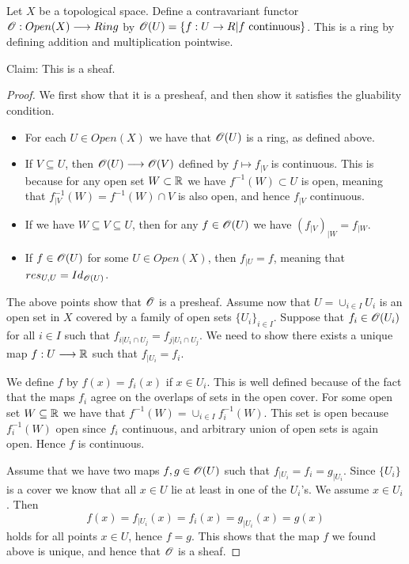 \begin{example}
Let $X$ be a topological space. Define a contravariant functor $\mathscr{O}:Open(X)\longrightarrow Ring$ by $\mathscr{O}(U)=\{ f:U\rightarrow R \vert f \text{ continuous}\}$. This is a ring by defining addition and multiplication pointwise. 

Claim: This is a sheaf. 

\begin{proof}
We first show that it is a presheaf, and then show it satisfies the gluability condition. 
\begin{itemize}
    \item For each $U\in Open(X)$ we have that $\mathscr{O}(U)$ is a ring, as defined above. 
    \item If $V\subseteq U$, then $\mathscr{O}(U)\longrightarrow \mathscr{O}(V)$ defined by $f\longmapsto f_{\vert V}$ is continuous. This is because for any open set $W\subset \mathbb{R}$ we have $f^{-1}(W)\subset U$ is open, meaning that $f_{\vert V}^{-1}(W) = f^{-1}(W)\cap V$ is also open, and hence $f_{\vert V}$ continuous. 
    \item If we have $W\subseteq V\subseteq U$, then for any $f\in \mathscr{O}(U)$ we have $(f_{\vert V})_{\vert W} = f_{\vert W}$. 
    \item If $f\in \mathscr{O}(U)$ for some $U\in Open(X)$, then $f_{\vert U} = f$, meaning that $res_{U, U}=Id_{\mathscr{O}(U)}$. 
\end{itemize}

The above points show that $\mathscr{O}$ is a presheaf. Assume now that $U=\cup_{i\in I}U_i$ is an open set in $X$ covered by a family of open sets $\{U_i\}_{i\in I}$. Suppose that $f_i\in \mathscr{O}(U_i)$ for all $i\in I$ such that $f_{i\vert U_i\cap U_j} = f_{j\vert U_i\cap U_j}$. We need to show there exists a unique map $f:U\longrightarrow \mathbb{R}$ such that $f_{\vert U_i} = f_i$. 

We define $f$ by $f(x)=f_i(x)$ if $x\in U_i$. This is well defined because of the fact that the maps $f_i$ agree on the overlaps of sets in the open cover. For some open set $W\subseteq \mathbb{R}$ we have that $f^{-1}(W) = \cup_{i\in I}f_i^{-1}(W)$. This set is open because $f_i^{-1}(W)$ open since $f_i$ continuous, and arbitrary union of open sets is again open. Hence $f$ is continuous. 

Assume that we have two maps $f, g\in \mathscr{O}(U)$ such that $f_{\vert U_i}=f_i = g_{\vert U_i}$. Since $\{U_i\}$ is a cover we know that all $x\in U$ lie at least in one of the $U_i$'s. We assume $x\in U_i$. Then \begin{equation*}
    f(x)=f_{\vert U_i}(x) = f_i(x)=g_{\vert U_i}(x) = g(x)
\end{equation*}
holds for all points $x\in U$, hence $f=g$. This shows that the map $f$ we found above is unique, and hence that $\mathscr{O}$ is a sheaf. 
\end{proof}
\end{example}

